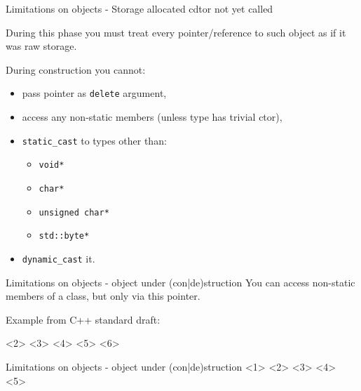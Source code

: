 \documentclass{panicsoftware-presentation}
\makeatletter
\newenvironment{itemizeSeq}{\begin{itemize}[<+-|alert@+>]}{\end{itemize}}
\makeatother
\begin{document}
\begin{frame}{Limitations on objects - Storage allocated cdtor not yet called}

During this phase you must treat every pointer/reference to such object as if it was raw storage.

During construction you cannot:
\begin{itemizeSeq}
	\item pass pointer as \texttt{delete} argument,
	\item access any non-static members (unless type has trivial ctor),
	\item \texttt{static\_cast} to types other than:
	\begin{itemize}
		\item \texttt{void*}
		\item \texttt{char*}
		\item \texttt{unsigned char*}
		\item \texttt{std::byte*}
	\end{itemize} 
	\item \texttt{dynamic\_cast} it.
\end{itemizeSeq}

\end{frame}

\begin{frame}{Limitations on objects - object under (con|de)struction}
You \alert{can access non-static members of a class}, but only via \alert{this} pointer.

Example from C++ standard draft:

<2>
<3>
<4>
<5>
<6>

\end{frame}

\begin{frame}{Limitations on objects - object under (con|de)struction}
<1>
<2>
<3>
<4>
<5>

\end{frame}
\end{document}
